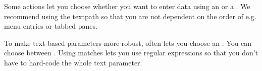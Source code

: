 Some actions let you choose whether you want to enter data using an  or a . We recommend using the textpath so that you are not dependent on the order of e.g. menu entries or tabbed panes. 

To make text-based parameters more robust, \gd{} often lets you choose an . You can choose between . Using matches lets you use regular expressions so that you don't have to hard-code the whole text parameter. 




